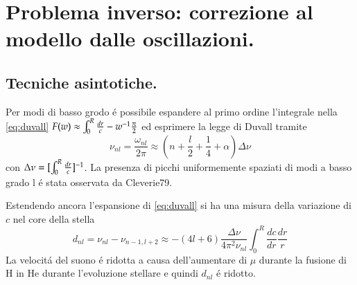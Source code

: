 \documentclass[oneside,12pt]{memoir}
\begin{document}
\begin{comment}
Le onde di gravit\'a sono presenti nelle regioni in cui il gas \'e neutro o completamente ionizzato ($N^2$ grande) e sono riflesse in regioni dove $N$ \'e piccolo o immaginario: ionizzazione parziale, instabilit\'a convettiva, centro del Sole.

Ho cavit\'a risonanti per modi g:
\begin{itemize}
    \item Core radiativo.
    
    Tra la la parte centrale dove $g\to0$ e il fondo della zona convettiva dove $N^2<0$.
    \item Atmosfera.
    
    $N$ ha un massimo in coincidenza del punto $T_m$ nella cromosfera: modi g confinati tra zona convettiva e cromosfera ($\Pi\approx\numrange{180}{800}\si{\second}$).
\end{itemize}

\end{comment}


\part{Problema inverso: correzione al modello dalle oscillazioni.}


\chapter{Tecniche asintotiche.}

Per modi di basso grodo \'e possibile espandere al primo ordine l'integrale nella \eqref{eq:duvall} $F(w)\approx\int_0^R\frac{dr}{c}-w^{-1}\frac{\pi}{2}$ ed esprimere la legge di Duvall tramite
\begin{equation}\label{eq:claverie}
    \nu_{nl}=\frac{\omega_{nl}}{2\pi}\approx(n+\frac{l}{2}+\frac{1}{4}+\alpha)\Delta\nu
\end{equation}
con $\Delta\nu=[\int_0^R\frac{dr}{c}]^{-1}$.
La presenza di picchi uniformemente spaziati di modi a basso grado l \'e stata osservata da Cleverie79.

Estendendo ancora l'espansione di \eqref{eq:duvall} si ha una misura della variazione di $c$ nel core della stella
\begin{equation}\label{eq:tassoul}
    d_{nl}=\nu_{nl}-\nu_{n-1,l+2}\approx-(4l+6)\frac{\Delta\nu}{4\pi^2\nu_{nl}}\int_0^R\frac{dc}{dr}\frac{dr}{r}
\end{equation}
La velocit\'a del suono \'e ridotta a causa dell'aumentare di $\mu$ durante la fusione di H in He durante l'evoluzione stellare e quindi $d_{nl}$ \'e ridotto.
\end{document}
